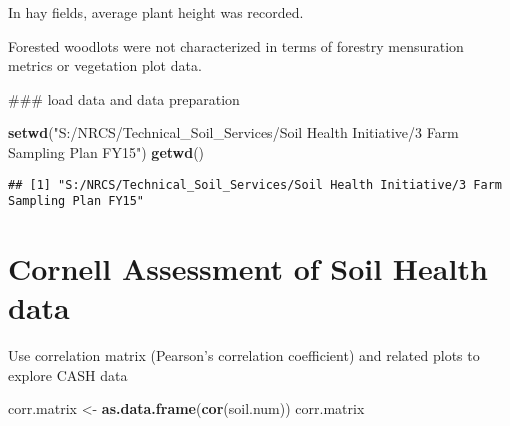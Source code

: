 \documentclass[]{article}
\newenvironment{Shaded}{\begin{snugshade}}{\end{snugshade}}
\newcommand{\KeywordTok}[1]{\textcolor[rgb]{0.13,0.29,0.53}{\textbf{#1}}}
\newcommand{\DecValTok}[1]{\textcolor[rgb]{0.00,0.00,0.81}{#1}}
\newcommand{\StringTok}[1]{\textcolor[rgb]{0.31,0.60,0.02}{#1}}
\newcommand{\OperatorTok}[1]{\textcolor[rgb]{0.81,0.36,0.00}{\textbf{#1}}}
\newcommand{\NormalTok}[1]{#1}
\begin{document}
In hay fields, average plant height was recorded.

Forested woodlots were not characterized in terms of forestry
mensuration metrics or vegetation plot data.

\begin{Shaded}
\begin{Highlighting}[]
\NormalTok{### load data and data preparation}

\KeywordTok{setwd}\NormalTok{(}\StringTok{"S:/NRCS/Technical_Soil_Services/Soil Health Initiative/3 Farm Sampling Plan FY15"}\NormalTok{)}
\KeywordTok{getwd}\NormalTok{()}
\end{Highlighting}
\end{Shaded}

\begin{verbatim}
## [1] "S:/NRCS/Technical_Soil_Services/Soil Health Initiative/3 Farm Sampling Plan FY15"
\end{verbatim}

\begin{Shaded}
\end{Shaded}

\section{Cornell Assessment of Soil Health
data}\label{cornell-assessment-of-soil-health-data}

Use correlation matrix (Pearson's correlation coefficient) and related
plots to explore CASH data

\begin{Shaded}
\begin{Highlighting}[]
\NormalTok{corr.matrix <-}\StringTok{ }\KeywordTok{as.data.frame}\NormalTok{(}\KeywordTok{cor}\NormalTok{(soil.num))}
\NormalTok{corr.matrix}
\end{Highlighting}
\end{Shaded}
\end{document}

